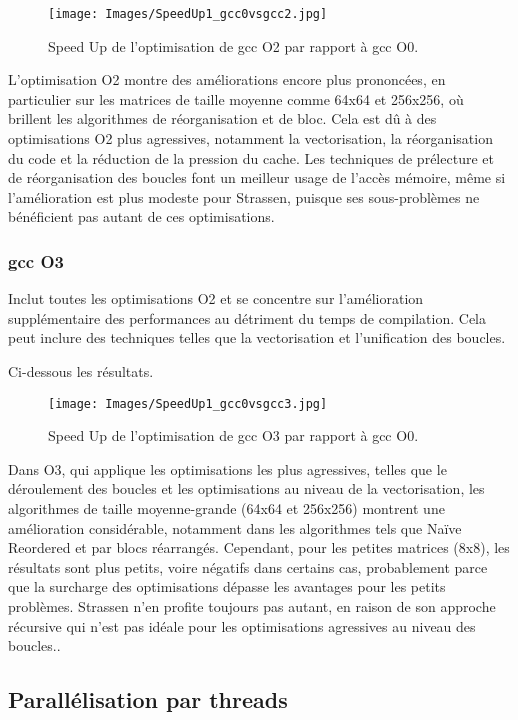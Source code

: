 \documentclass[../CSC_5RO06_TA.tex]{subfiles}
\begin{document}
\begin{figure}[H]
    \centering
    \texttt{[image: Images/SpeedUp1\_gcc0vsgcc2.jpg]}
    \caption{Speed Up de l'optimisation de gcc O2 par rapport à gcc O0.}
    \label{fig:3}
\end{figure}

L'optimisation O2 montre des améliorations encore plus prononcées, en particulier sur les matrices de taille moyenne comme 64x64 et 256x256, où brillent les algorithmes de réorganisation et de bloc. Cela est dû à des optimisations O2 plus agressives, notamment la vectorisation, la réorganisation du code et la réduction de la pression du cache. Les techniques de prélecture et de réorganisation des boucles font un meilleur usage de l'accès mémoire, même si l'amélioration est plus modeste pour Strassen, puisque ses sous-problèmes ne bénéficient pas autant de ces optimisations.

\subsubsection{gcc O3}

Inclut toutes les optimisations O2 et se concentre sur l’amélioration supplémentaire des performances au détriment du temps de compilation. Cela peut inclure des techniques telles que la vectorisation et l'unification des boucles.

Ci-dessous les résultats.

\begin{figure}[H]
    \centering
    \texttt{[image: Images/SpeedUp1\_gcc0vsgcc3.jpg]}
    \caption{Speed Up de l'optimisation de gcc O3 par rapport à gcc O0.}
    \label{fig:4}
\end{figure}

Dans O3, qui applique les optimisations les plus agressives, telles que le déroulement des boucles et les optimisations au niveau de la vectorisation, les algorithmes de taille moyenne-grande (64x64 et 256x256) montrent une amélioration considérable, notamment dans les algorithmes tels que Naïve Reordered et par blocs réarrangés. Cependant, pour les petites matrices (8x8), les résultats sont plus petits, voire négatifs dans certains cas, probablement parce que la surcharge des optimisations dépasse les avantages pour les petits problèmes. Strassen n'en profite toujours pas autant, en raison de son approche récursive qui n'est pas idéale pour les optimisations agressives au niveau des boucles..

\subsection{Parallélisation par threads}
\end{document}
